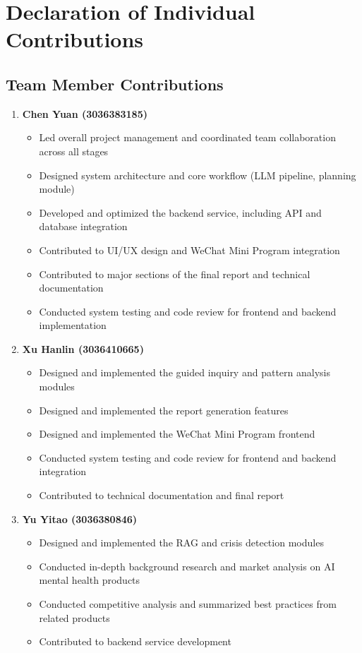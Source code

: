 \appendix

\section{Declaration of Individual Contributions}
\label{sec:contributions}

\subsection{Team Member Contributions}

\begin{enumerate}
    \item \textbf{Chen Yuan (3036383185)} 
    \begin{itemize}
        \item Led overall project management and coordinated team collaboration across all stages
        \item Designed system architecture and core workflow (LLM pipeline, planning module)
        \item Developed and optimized the backend service, including API and database integration
        \item Contributed to UI/UX design and WeChat Mini Program integration
        \item Contributed to major sections of the final report and technical documentation
        \item Conducted system testing and code review for frontend and backend implementation
    \end{itemize}
    
    \item \textbf{Xu Hanlin (3036410665)} 
    \begin{itemize}
        \item Designed and implemented the guided inquiry and pattern analysis modules
        \item Designed and implemented the report generation features
        \item Designed and implemented the WeChat Mini Program frontend
        \item Conducted system testing and code review for frontend and backend integration
        \item Contributed to technical documentation and final report
    \end{itemize}
    
    \item \textbf{Yu Yitao (3036380846)} 
    \begin{itemize}
        \item Designed and implemented the RAG and crisis detection modules
        \item Conducted in-depth background research and market analysis on AI mental health products
        \item Conducted competitive analysis and summarized best practices from related products
        \item Contributed to backend service development
    \end{itemize}
    

\end{enumerate}

